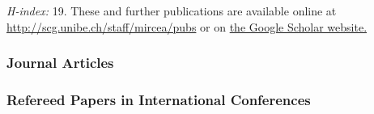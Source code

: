 \newcommand{\paper}[3]{\item \emph{\bf #1}\\#2\\In #3}

\newcommand{\densepaper}[3]{\item \emph{\bf #1. }#2. In #3}

\newcommand{\densepap}[6]{\item \emph{\bf #1}\\#2\\ In #3, p. #4. #6}

\newcommand{\ieee}{IEEE Computer Society}
\newcommand{\IEEE}{\ieee}


\emph{H-index:} 19.
These and further publications are available online at \url{http://scg.unibe.ch/staff/mircea/pubs} or on \href{http://scholar.google.ch/citations?user=7zx6Cg0AAAAJ}{the Google Scholar website.}

\subsubsection*{Journal Articles}
	

\subsubsection*{Refereed Papers in International Conferences}
	
